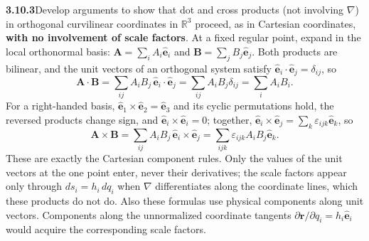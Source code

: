 \par\bigskip
\noindent\textbf{3.10.3}\quad Develop arguments to show that dot and cross
products (not involving $\nabla$) in orthogonal curvilinear coordinates in
$\mathbb{R}^{3}$ proceed, as in Cartesian coordinates, \textbf{with no
involvement of scale factors}.
\solution
At a fixed regular point, expand in the local orthonormal basis:
$\mathbf A=\sum_iA_i\hat{\mathbf e}_i$ and
$\mathbf B=\sum_jB_j\hat{\mathbf e}_j$. Both products are bilinear,
and the unit vectors of an orthogonal system satisfy
$\hat{\mathbf e}_i\cdot\hat{\mathbf e}_j=\delta_{ij}$, so
\[
\mathbf A\cdot\mathbf B
=\sum_{ij}A_iB_j\,\hat{\mathbf e}_i\cdot\hat{\mathbf e}_j
=\sum_{ij}A_iB_j\delta_{ij}=\sum_iA_iB_i.
\]
For a right-handed basis,
$\hat{\mathbf e}_1\times\hat{\mathbf e}_2=\hat{\mathbf e}_3$ and its
cyclic permutations hold, the reversed products change sign, and
$\hat{\mathbf e}_i\times\hat{\mathbf e}_i=0$; together,
$\hat{\mathbf e}_i\times\hat{\mathbf e}_j
=\sum_k\varepsilon_{ijk}\hat{\mathbf e}_k$, so
\[
\mathbf A\times\mathbf B
=\sum_{ij}A_iB_j\,\hat{\mathbf e}_i\times\hat{\mathbf e}_j
=\sum_{ijk}\varepsilon_{ijk}A_iB_j\hat{\mathbf e}_k.
\]
These are exactly the Cartesian component rules. Only the values of
the unit vectors at the one point enter, never their derivatives; the
scale factors appear only through $ds_i=h_i\,dq_i$ when $\nabla$
differentiates along the coordinate lines, which these products do not do.
Also these formulas use physical components along unit vectors. Components
along the unnormalized coordinate tangents
$\partial\mathbf r/\partial q_i=h_i\hat{\mathbf e}_i$ would acquire
the corresponding scale factors.

